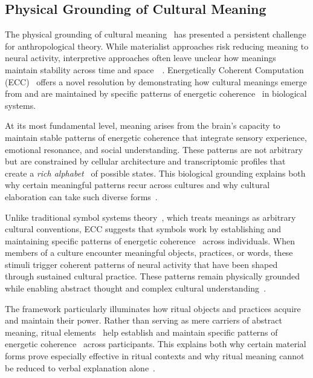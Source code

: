 \subsection*{Physical Grounding of Cultural Meaning}

The physical grounding of cultural meaning~ has presented a persistent challenge for anthropological theory. While materialist approaches risk reducing meaning to neural activity, interpretive approaches often leave unclear how meanings maintain stability across time and space~~\cite{dandrade1995development,strathern2004partial}. Energetically Coherent Computation (ECC)~ offers a novel resolution by demonstrating how cultural meanings emerge from and are maintained by specific patterns of energetic coherence~ in biological systems.

At its most fundamental level, meaning arises from the brain's capacity to maintain stable patterns of energetic coherence that integrate sensory experience, emotional resonance, and social understanding. These patterns are not arbitrary but are constrained by cellular architecture and transcriptomic profiles that create a \textit{rich alphabet}~ of possible states. This biological grounding explains both why certain meaningful patterns recur across cultures and why cultural elaboration can take such diverse forms~\cite{bloch2012anthropology,hayles2017unthought}.

Unlike traditional symbol systems theory~\cite{harnad1990symbol}, which treats meanings as arbitrary cultural conventions, ECC suggests that symbols work by establishing and maintaining specific patterns of energetic coherence~ across individuals. When members of a culture encounter meaningful objects, practices, or words, these stimuli trigger coherent patterns of neural activity that have been shaped through sustained cultural practice. These patterns remain physically grounded~ while enabling abstract thought and complex cultural understanding~\cite{lakoff1999philosophy,suchman2007human}.

The framework particularly illuminates how ritual objects and practices acquire and maintain their power. Rather than serving as mere carriers of abstract meaning, ritual elements~ help establish and maintain specific patterns of energetic coherence~ across participants. This explains both why certain material forms prove especially effective in ritual contexts and why ritual meaning cannot be reduced to verbal explanation alone~\cite{warnier2001praxeological}.

